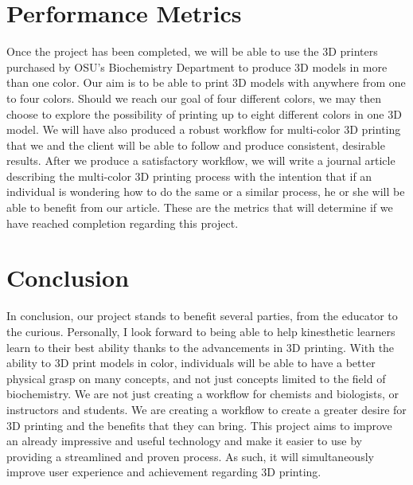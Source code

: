 \documentclass[onecolumn, draftclsnofoot,10pt, compsoc]{IEEEtran}
\begin{document}
\section{Performance Metrics}
Once the project has been completed, we will be able to use the 3D printers purchased by OSU's Biochemistry Department to produce 3D models in more than one color.
Our aim is to be able to print 3D models with anywhere from one to four colors. 
Should we reach our goal of four different colors, we may then choose to explore the possibility of printing up to eight different colors in one 3D model. 
We will have also produced a robust workflow for multi-color 3D printing that we and the client will be able to follow and produce consistent, desirable results. 
After we produce a satisfactory workflow, we will write a journal article describing the multi-color 3D printing process with the intention that if an individual is wondering how to do the same or a similar process, he or she will be able to benefit from our article. 
These are the metrics that will determine if we have reached completion regarding this project. 

\section{Conclusion}
In conclusion, our project stands to benefit several parties, from the educator to the curious. 
Personally, I look forward to being able to help kinesthetic learners learn to their best ability thanks to the advancements in 3D printing. 
With the ability to 3D print models in color, individuals will be able to have a better physical grasp on many concepts, and not just concepts limited to the field of biochemistry.
We are not just creating a workflow for chemists and biologists, or instructors and students.
We are creating a workflow to create a greater desire for 3D printing and the benefits that they can bring. 
This project aims to improve an already impressive and useful technology and make it easier to use by providing a streamlined and proven process.
As such, it will simultaneously improve user experience and achievement regarding 3D printing. 
\end{document}
